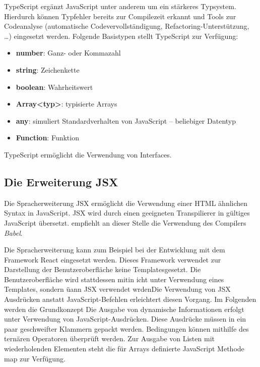 TypeScript ergänzt JavaScript unter anderem um ein stärkeres Typsystem. Hierdurch können Typfehler bereits zur Compilezeit erkannt und Tools zur Codeanalyse (automatische Codevervollständigung, Refactoring-Unterstützung, …) eingesetzt werden.\autocites[vgl.][27\psqq]{Woiwode.2018}[vgl.][13\psqq]{Steyer.2017}[vgl.][10]{Zeigermann.2016} Folgende Basistypen stellt TypeScript zur Verfügung: \autocites[vgl.][34\psqq]{Woiwode.2018}[vgl.][16\psqq]{Steyer.2017}

\begin{itemize}
	\item  \textbf{number}: Ganz- oder Kommazahl
	\item \textbf{string}:  Zeichenkette
	\item \textbf{boolean}: Wahrheitswert
	\item \textbf{Array<typ>}: typisierte Arrays
	\item \textbf{any}: simuliert Standardverhalten von JavaScript  – beliebiger Datentyp
	\item \textbf{Function}: Funktion
\end{itemize}
TypeScript ermöglicht die Verwendung von Interfaces. \autocites[vgl.][40\psq]{Woiwode.2018}

\subsection{Die Erweiterung JSX}\label{sec:die-erweiterung-jsx}
\label{Babel}
Die Spracherweiterung JSX ermöglicht die Verwendung einer HTML ähnlichen Syntax in JavaScript. JSX wird durch einen geeigneten Transpilierer in gültiges JavaScript übersetzt.\textcite[vgl.][10]{Zeigermann.2016} empfiehlt an dieser Stelle die Verwendung des Compilers \textit{Babel}.

Die Spracherweiterung kann zum Beispiel bei der Entwicklung mit dem Framework React eingesetzt werden. Dieses Framework verwendet zur Darstellung der Benutzeroberfläche keine Templatesgesetzt. Die Benutzeroberfläche wird stattdessen mitin icht unter Verwendung eines Templates, sondern üann JSX verwendet wrdenDie Verwendung von JSX Ausdrücken anstatt JavaScript-Befehlen erleichtert diesen Vorgang. Im Folgenden werden die Grundkonzept
Die Ausgabe von dynamische Informationen erfolgt unter Verwendung von JavaScript-Ausdrücken. Diese Ausdrücke müssen in ein paar geschweifter Klammern gepackt werden. Bedingungen können mithilfe des ternären Operatoren überprüft werden. Zur Ausgabe von Listen mit wiederholenden Elementen steht die für Arrays definierte JavaScript Methode map zur Verfügung.

